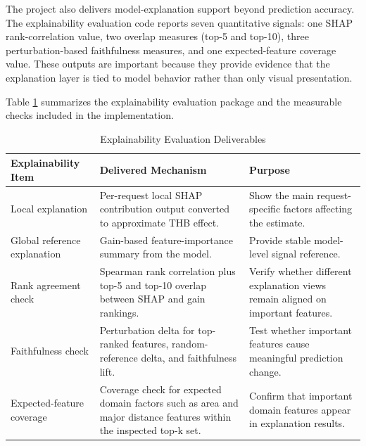 The project also delivers model-explanation support beyond prediction accuracy. The explainability evaluation code reports seven quantitative signals: one SHAP rank-correlation value, two overlap measures (top-5 and top-10), three perturbation-based faithfulness measures, and one expected-feature coverage value. These outputs are important because they provide evidence that the explanation layer is tied to model behavior rather than only visual presentation.

Table \ref{tab:chapter7-explainability-evaluation} summarizes the explainability evaluation package and the measurable checks included in the implementation.

\begin{table}[htbp]
    \centering
    \small
    \renewcommand{\arraystretch}{1.25}
    \begin{tabularx}{\textwidth}{>{\raggedright\arraybackslash}p{}>{\raggedright\arraybackslash}p{}>{\raggedright\arraybackslash}X}
        \toprule
        \rowcolor[gray]{0.9} \textbf{Explainability Item} & \textbf{Delivered Mechanism} & \textbf{Purpose} \\
        \midrule
        Local explanation & Per-request local SHAP contribution output converted to approximate THB effect. & Show the main request-specific factors affecting the estimate. \\
        Global reference explanation & Gain-based feature-importance summary from the model. & Provide stable model-level signal reference. \\
        Rank agreement check & Spearman rank correlation plus top-5 and top-10 overlap between SHAP and gain rankings. & Verify whether different explanation views remain aligned on important features. \\
        Faithfulness check & Perturbation delta for top-ranked features, random-reference delta, and faithfulness lift. & Test whether important features cause meaningful prediction change. \\
        Expected-feature coverage & Coverage check for expected domain factors such as area and major distance features within the inspected top-k set. & Confirm that important domain features appear in explanation results. \\
        \bottomrule
    \end{tabularx}
    \caption{Explainability Evaluation Deliverables}
    \label{tab:chapter7-explainability-evaluation}
\end{table}

